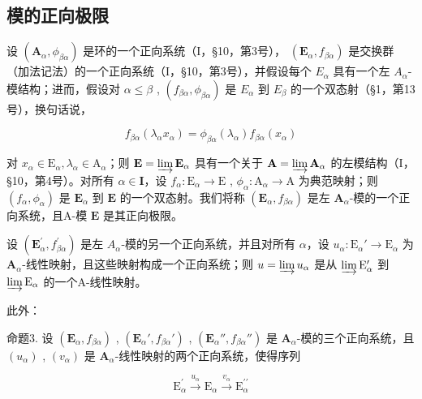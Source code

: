 \subsection{模的正向极限}


设 \((\mathbf{A}_{\alpha}, \phi_{\beta\alpha})\) 是环的一个正向系统（I，§10，第3号）， \((\mathbf{E}_{\alpha}, f_{\beta\alpha})\) 是交换群（加法记法）的一个正向系统（I，§10，第3号），并假设每个 \(E_{\alpha}\) 具有一个左 \(A_{\alpha}\)-模结构；进而，假设对 \(\alpha \leqslant \beta\) , \((f_{\beta\alpha}, \phi_{\beta\alpha})\) 是 \(E_{\alpha}\) 到 \(E_{\beta}\) 的一个双态射（§1，第13号），换句话说，

\[
f _ {\beta \alpha} (\lambda_ {\alpha} x _ {\alpha}) = \phi_ {\beta \alpha} (\lambda_ {\alpha}) f _ {\beta \alpha} (x _ {\alpha})\tag{4}
\]

对 \(x_{\alpha} \in \mathrm{E}_{\alpha}, \lambda_{\alpha} \in \mathrm{A}_{\alpha}\)；则 \(\mathbf{E} = \varinjlim \mathbf{E}_{\alpha}\) 具有一个关于 \(\mathbf{A} = \varinjlim \mathbf{A}_{\alpha}\) 的左模结构（I，§10，第4号）。对所有 \(\alpha \in \mathbf{I}\)，设 \(f_{\alpha}: \mathrm{E}_{\alpha} \to \mathrm{E}\) , \(\phi_{\alpha}: \mathrm{A}_{\alpha} \to \mathrm{A}\) 为典范映射；则 \((f_{\alpha}, \phi_{\alpha})\) 是 \(\mathbf{E}_{\alpha}\) 到 \(\mathbf{E}\) 的一个双态射。我们将称 \((\mathbf{E}_{\alpha}, f_{\beta \alpha})\) 是左 \(\mathbf{A}_{\alpha}\)-模的一个正向系统，且A-模 \(\mathbf{E}\) 是其正向极限。

设 \((\mathbf{E}_{\alpha}^{\prime}, f_{\beta \alpha}^{\prime})\) 是左 \(A_{\alpha}\)-模的另一个正向系统，并且对所有 \(\alpha\)，设 \(u_{\alpha}: \mathrm{E}_{\alpha}' \to \mathrm{E}_{\alpha}\) 为 \(\mathbf{A}_{\alpha}\)-线性映射，且这些映射构成一个正向系统；则 \(u = \varinjlim u_{\alpha}\) 是从 \(\varinjlim \mathrm{E}_{\alpha}'\) 到 \(\varinjlim \mathrm{E}_{\alpha}\) 的一个A-线性映射。

此外：

命题3. 设 \((\mathbf{E}_{\alpha}, f_{\beta \alpha})\) , \((\mathbf{E}_{\alpha}', f_{\beta \alpha}')\) , \((\mathbf{E}_{\alpha}'', f_{\beta \alpha}'')\) 是 \(\mathbf{A}_{\alpha}\)-模的三个正向系统，且 \((u_{\alpha})\) , \((v_{\alpha})\) 是 \(\mathbf{A}_{\alpha}\)-线性映射的两个正向系统，使得序列

\[
\mathrm{E} _ {\alpha} ^ {\prime} \xrightarrow {u _ {\alpha}} \mathrm{E} _ {\alpha} \xrightarrow {v _ {\alpha}} \mathrm{E} _ {\alpha} ^ {\prime \prime}
\]

